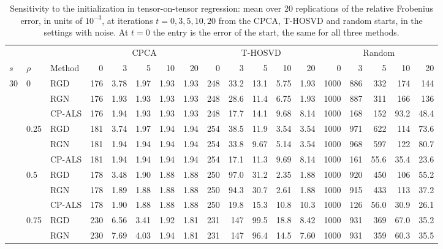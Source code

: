 \begin{table}[!htbp]
\centering
\caption{Sensitivity to the initialization in tensor-on-tensor regression: mean over 20 replications of the relative Frobenius error, in units of $10^{-3}$, at iterations $t=0,3,5,10,20$ from the CPCA, T-HOSVD and random starts, in the settings with noise. At $t=0$ the entry is the error of the start, the same for all three methods.}
\label{tab:initialization_regression}
{\small\setlength{\tabcolsep}{2.5pt}
\begin{tabular}{lll*{15}{r}}
\toprule
 & & & \multicolumn{5}{c}{CPCA} & \multicolumn{5}{c}{T-HOSVD} & \multicolumn{5}{c}{Random} \\
\cmidrule(lr){4-8}\cmidrule(lr){9-13}\cmidrule(l){14-18}
$s$ & $\rho$ & Method & 0 & 3 & 5 & 10 & 20 & 0 & 3 & 5 & 10 & 20 & 0 & 3 & 5 & 10 & 20 \\
\midrule
30 & 0 & RGD & 176 & 3.78 & 1.97 & 1.93 & 1.93 & 248 & 33.2 & 13.1 & 5.75 & 1.93 & 1000 & 886 & 332 & 174 & 144 \\
 &  & RGN & 176 & 1.93 & 1.93 & 1.93 & 1.93 & 248 & 28.6 & 11.4 & 6.75 & 1.93 & 1000 & 887 & 311 & 166 & 136 \\
 &  & CP-ALS & 176 & 1.94 & 1.93 & 1.93 & 1.93 & 248 & 17.7 & 14.1 & 9.68 & 8.14 & 1000 & 168 & 152 & 93.2 & 48.4 \\
\addlinespace
 & 0.25 & RGD & 181 & 3.74 & 1.97 & 1.94 & 1.94 & 254 & 38.5 & 11.9 & 3.54 & 3.54 & 1000 & 971 & 622 & 114 & 73.6 \\
 &  & RGN & 181 & 1.94 & 1.94 & 1.94 & 1.94 & 254 & 33.8 & 9.67 & 5.14 & 3.54 & 1000 & 968 & 597 & 122 & 80.7 \\
 &  & CP-ALS & 181 & 1.94 & 1.94 & 1.94 & 1.94 & 254 & 17.1 & 11.3 & 9.69 & 8.14 & 1000 & 161 & 55.6 & 35.4 & 23.6 \\
\addlinespace
 & 0.5 & RGD & 178 & 3.48 & 1.90 & 1.88 & 1.88 & 250 & 97.0 & 31.2 & 2.35 & 1.88 & 1000 & 920 & 450 & 106 & 55.2 \\
 &  & RGN & 178 & 1.89 & 1.88 & 1.88 & 1.88 & 250 & 94.3 & 30.7 & 2.61 & 1.88 & 1000 & 915 & 433 & 113 & 37.2 \\
 &  & CP-ALS & 178 & 1.90 & 1.88 & 1.88 & 1.88 & 250 & 19.8 & 15.3 & 10.8 & 10.3 & 1000 & 126 & 56.0 & 30.9 & 26.1 \\
\addlinespace
 & 0.75 & RGD & 230 & 6.56 & 3.41 & 1.92 & 1.81 & 231 & 147 & 99.5 & 18.8 & 8.42 & 1000 & 931 & 369 & 67.0 & 35.2 \\
 &  & RGN & 230 & 7.69 & 4.03 & 1.94 & 1.81 & 231 & 147 & 96.4 & 14.5 & 7.60 & 1000 & 931 & 359 & 60.3 & 35.5 \\

\end{tabular}}
\end{table}
